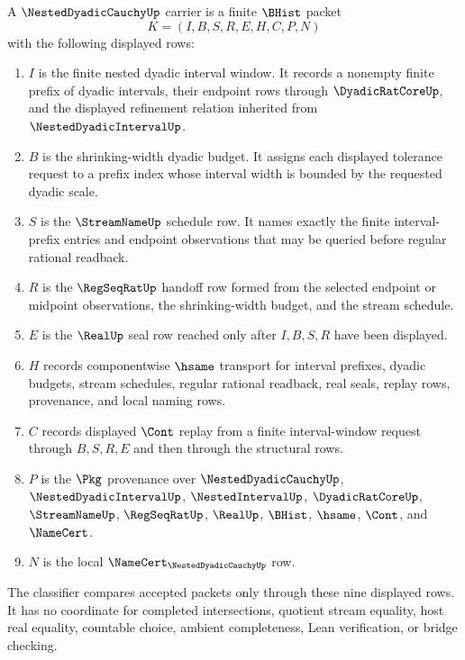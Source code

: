 \begin{definition}
\label{def:nested-dyadic-cauchy-carrier}
A $\NestedDyadicCauchyUp$ carrier is a finite $\BHist$ packet
$$
K=(I,B,S,R,E,H,C,P,N)
$$
with the following displayed rows:
\begin{enumerate}
\item $I$ is the finite nested dyadic interval window. It records a nonempty finite prefix of dyadic intervals, their endpoint rows through $\DyadicRatCoreUp$, and the displayed refinement relation inherited from $\NestedDyadicIntervalUp$.
\item $B$ is the shrinking-width dyadic budget. It assigns each displayed tolerance request to a prefix index whose interval width is bounded by the requested dyadic scale.
\item $S$ is the $\StreamNameUp$ schedule row. It names exactly the finite interval-prefix entries and endpoint observations that may be queried before regular rational readback.
\item $R$ is the $\RegSeqRatUp$ handoff row formed from the selected endpoint or midpoint observations, the shrinking-width budget, and the stream schedule.
\item $E$ is the $\RealUp$ seal row reached only after $I,B,S,R$ have been displayed.
\item $H$ records componentwise $\hsame$ transport for interval prefixes, dyadic budgets, stream schedules, regular rational readback, real seals, replay rows, provenance, and local naming rows.
\item $C$ records displayed $\Cont$ replay from a finite interval-window request through $B,S,R,E$ and then through the structural rows.
\item $P$ is the $\Pkg$ provenance over $\NestedDyadicCauchyUp$, $\NestedDyadicIntervalUp$, $\NestedIntervalUp$, $\DyadicRatCoreUp$, $\StreamNameUp$, $\RegSeqRatUp$, $\RealUp$, $\BHist$, $\hsame$, $\Cont$, and $\NameCert$.
\item $N$ is the local $\NameCert_{\NestedDyadicCauchyUp}$ row.
\end{enumerate}
The classifier compares accepted packets only through these nine displayed rows. It has no coordinate for completed intersections, quotient stream equality, host real equality, countable choice, ambient completeness, Lean verification, or bridge checking.
\end{definition}

